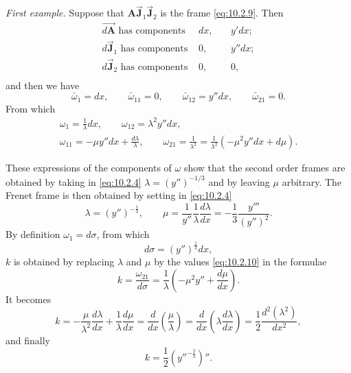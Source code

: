 \documentclass[leqno,11pt]{book}
\numberwithin{equation}{chapter}
\theoremstyle{shape1}
\theoremstyle{shapesmall}
\newcommand{\rvec}[1]{\vec{\mathbf{#1}}}
\newcommand{\jvec}{\rvec{J}}
\newcommand{\somespace}{\vspace{9pt}}
\begin{document}
\somespace

\emph{First example.} Suppose that $\mathbf{A}\jvec_{1}\jvec_{2}$ is the frame \eqref{eq:10.2.9}. Then
\[
\begin{alignedat}{10}
  \overrightarrow{d\mathbf{A}}\text{ has components }&dx,\ &&y'dx;\\
  {d\jvec_{1}}\text{ has components }&0,&&y''dx;\\
  {d\jvec_{2}}\text{ has components }&0,&&0,\\
\end{alignedat}
\]
and then we have
\[
\bar\omega_{1}=dx,\qquad\bar\omega_{11}=0,\qquad\bar\omega_{12}=y''dx,\qquad\bar\omega_{21}=0.
\]
From which
\begin{gather*}
  \omega_{1}=\frac{1}{\lambda}dx,\qquad\omega_{12}=\lambda^{2}y''dx,\\
  \omega_{11}=-\mu y''dx+\frac{d\lambda}{\lambda},\qquad\omega_{21}=\frac{1}{\lambda^{2}}=\frac{1}{\lambda^{2}}(-\mu^{2}y''dx+d\mu).
\end{gather*}

These expressions of the components of $\omega$ show that the second order frames are obtained by taking in \eqref{eq:10.2.4} $\lambda=(y'')^{-1/3}$ and by leaving $\mu$ arbitrary. The Frenet frame is then obtained by setting in \eqref{eq:10.2.4}
\begin{equation}
  \label{eq:10.2.10}
  \lambda=(y'')^{-\frac{1}{3}},\qquad\mu=\frac{1}{y''}\frac{1}{\lambda}\frac{d\lambda}{dx}=-\frac{1}{3}\frac{y'''}{(y'')^{2}}.
\end{equation}
By definition $\omega_{1}=d\sigma$, from which
\begin{equation}
  \label{eq:10.2.11}
  d\sigma=(y'')^{\frac{1}{3}}dx,
\end{equation}
$k$ is obtained by replacing $\lambda$ and $\mu$ by the values \eqref{eq:10.2.10} in the formulae
\[
k=\frac{\omega_{21}}{d\sigma}=\frac{1}{\lambda}\left(-\mu^{2}y''+\frac{d\mu}{dx}\right).
\]
It becomes
\[
k=-\frac{\mu}{\lambda^{2}}\frac{d\lambda}{dx}+\frac{1}{\lambda}\frac{d\mu}{dx}=\frac{d}{dx}\left(\frac{\mu}{\lambda}\right)=\frac{d}{dx}\left(\lambda\frac{d\lambda}{dx}\right)=\frac{1}{2}\frac{d^{2}(\lambda^{2})}{dx^{2}},
\]
and finally
\begin{equation}
  \label{eq:10.2.12}
  k=\frac{1}{2}\left(\left.y''\right.^{-\frac{2}{3}}\right)''.
\end{equation}

\somespace
\end{document}
